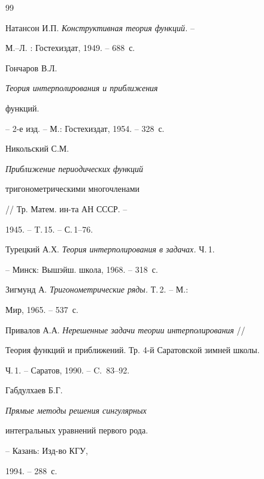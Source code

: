 \begin{thebibliography}{99}







Натансон И.П. {\em Конструктивная теория функций.} --


М.--Л. : Гостехиздат, 1949. -- 688~с.







Гончаров В.Л. {\em Теория интерполирования и приближения


функций.} -- 2-е изд. -- М.: Гостехиздат, 1954. -- 328~с.







Никольский С.М. {\em Приближение периодических функций


тригонометрическими многочленами} // Тр. Матем. ин-та АН СССР. --


1945. -- T.\,15. -- С.\,1--76.







Турецкий А.Х. {\em Теория интерполирования в задачах.} Ч.\,1.


-- Минск: Вышэйш. школа, 1968. -- 318~с.







Зигмунд А. {\em Тригонометрические ряды.} Т.\,2. -- М.:


Мир, 1965. -- 537~с.







Привалов А.А. {\em Нерешенные задачи теории интерполирования} //


Теория функций и приближений. Тр. 4-й Саратовской зимней школы.


Ч.\,1. -- Саратов, 1990. -- C.~83--92.







Габдулхаев Б.Г. {\em Прямые методы решения сингулярных


интегральных уравнений первого рода.} -- Казань: Изд-во КГУ,


1994. -- 288~с.






\end{thebibliography}
